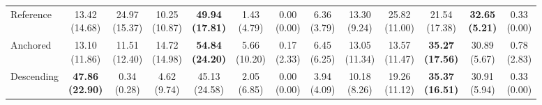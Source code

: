{\begin{tabular}{l|cccccc|cccccc}
Reference & \makecell{13.42 \\ (14.68)} & \makecell{24.97 \\ (15.37)} & \makecell{10.25 \\ (10.87)} & {\cellcolor[HTML]{C8E6C9}} \bfseries \makecell{49.94 \\ (17.81)} & \makecell{1.43 \\ (4.79)} & \makecell{0.00 \\ (0.00)} & \makecell{6.36 \\ (3.79)} & \makecell{13.30 \\ (9.24)} & \makecell{25.82 \\ (11.00)} & {\cellcolor[HTML]{C8E6C9}} \makecell{21.54 \\ (17.38)} & \bfseries \makecell{32.65 \\ (5.21)} & \makecell{0.33 \\ (0.00)} \\
Anchored & \makecell{13.10 \\ (11.86)} & \makecell{11.51 \\ (12.40)} & \makecell{14.72 \\ (14.98)} & {\cellcolor[HTML]{C8E6C9}} \bfseries \makecell{54.84 \\ (24.20)} & \makecell{5.66 \\ (10.20)} & \makecell{0.17 \\ (2.33)} & \makecell{6.45 \\ (6.25)} & \makecell{13.05 \\ (11.34)} & \makecell{13.57 \\ (11.47)} & {\cellcolor[HTML]{C8E6C9}} \bfseries \makecell{35.27 \\ (17.56)} & \makecell{30.89 \\ (5.67)} & \makecell{0.78 \\ (2.83)} \\
Descending & \bfseries \makecell{47.86 \\ (22.90)} & \makecell{0.34 \\ (0.28)} & \makecell{4.62 \\ (9.74)} & {\cellcolor[HTML]{C8E6C9}} \makecell{45.13 \\ (24.58)} & \makecell{2.05 \\ (6.85)} & \makecell{0.00 \\ (0.00)} & \makecell{3.94 \\ (4.09)} & \makecell{10.18 \\ (8.26)} & \makecell{19.26 \\ (11.12)} & {\cellcolor[HTML]{C8E6C9}} \bfseries \makecell{35.37 \\ (16.51)} & \makecell{30.91 \\ (5.94)} & \makecell{0.33 \\ (0.00)} \\
\bottomrule
\end{tabular}
}%
